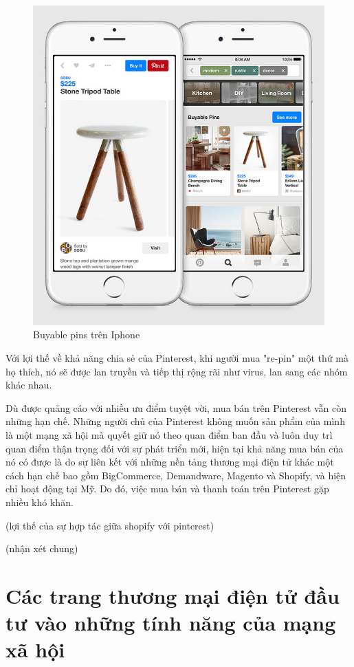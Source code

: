 \begin{figure}[H]
	\centering
	\includegraphics[scale=.4]{img/pin-buypins.jpg} 
	\caption{Buyable pins trên Iphone}
\end{figure}

Với lợi thế về khả năng chia sẻ của Pinterest, khi người mua "re-pin" một thứ mà họ thích, nó sẽ được lan truyền và tiếp thị rộng rãi như virus, lan sang các nhóm khác nhau. 

Dù được quảng cáo với nhiều ưu điểm tuyệt vời, mua bán trên Pinterest vẫn còn những hạn chế. Những người chủ của Pinterest không muốn sản phẩm của mình là một mạng xã hội mà quyết giữ nó theo quan điểm ban đầu và luôn duy trì quan điểm thận trọng đối với sự phát triển mới\cite{AllYouNeedtoKnowAboutPinterestBuyablePins}, hiện tại khả năng mua bán của nó có được là do sự liên kết với những nền tảng thương mại điện tử khác một cách hạn chế bao gồm BigCommerce, Demandware, Magento và Shopify, và hiện chỉ hoạt động tại Mỹ. Do đó, việc mua bán và thanh toán trên Pinterest gặp nhiều khó khăn.

(lợi thế của sự hợp tác giữa shopify với pinterest)

(nhận xét chung)

\section{Các trang thương mại điện tử đầu tư vào những tính năng của mạng xã hội}

